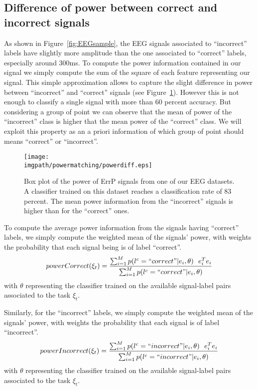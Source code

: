 \subsection{Difference of power between correct and incorrect signals}

As shown in Figure~\ref{fig:EEGsample}, the EEG signals associated to ``incorrect'' labels have slightly more amplitude than the one associated to ``correct'' labels, especially around 300ms. To compute the power information contained in our signal we simply compute the sum of the square of each feature representing our signal. This simple approximation allows to capture the slight difference in power between ``incorrect'' and ``correct'' signals (see Figure~\ref{fig:EEGpower}). However this is not enough to classify a single signal with more than 60 percent accuracy. But considering a group of point we can observe that the mean of power of the ``incorrect'' class is higher that the mean power of the ``correct'' class. We will exploit this property as an a priori information of which group of point should means ``correct'' or ``incorrect''.

\begin{figure}[!htbp]
\centering
\texttt{[image: \\imgpath/powermatching/powerdiff.eps]}
\caption{Box plot of the power of ErrP signals from one of our EEG datasets. A classifier trained on this dataset reaches a classification rate of 83 percent. The mean power information from the ``incorrect'' signals is higher than for the ``correct'' ones.}
\label{fig:EEGpower}
\end{figure} 

To compute the average power information from the signals having ``correct'' labels, we simply compute the weighted mean of the signals' power, with weights the probability that each signal  being is of label ``correct''.
\begin{eqnarray}
powerCorrect(\xi_t) = \frac{\sum_{i = 1}^{M} p(l^c = ``correct"| e_i , \theta) ~~ e_i^T e_i}{\sum_{i = 1}^{M} p(l^c = ``correct"| e_i , \theta)}
\label{eq:powerCorrect}
\end{eqnarray}
with $\theta$ representing the classifier trained on the available signal-label pairs associated to the task $\xi_t$.

Similarly, for the ``incorrect'' labels, we simply compute the weighted mean of the signals' power, with weights the probability that each signal is of label ``incorrect''. 
\begin{eqnarray}
powerIncorrect(\xi_t) = \frac{\sum_{i = 1}^{M} p(l^c = ``incorrect"| e_i , \theta) ~~ e_i^T e_i}{\sum_{i = 1}^{M} p(l^c = ``incorrect"| e_i , \theta)}
\label{eq:powerIncorrect}
\end{eqnarray}
with $\theta$ representing the classifier trained on the available signal-label pairs associated to the task $\xi_t$.


